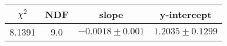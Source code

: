 \begin{tabular}{|c|c|c|c|}

\hline
$\chi^{2}$ & NDF & slope & y-intercept  \\
\hline
8.1391 & 9.0 & $-0.0018\pm0.001$ & $1.2035\pm0.1299$ \\
\hline

\end{tabular}